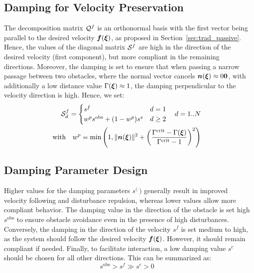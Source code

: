 \subsection{Damping for Velocity Preservation}
The decomposition matrix $\mathcal{Q}^{f}$ is an orthonormal basis with the first vector being parallel to the desired velocity $\boldsymbol{f}(\boldsymbol{\xi})$, as proposed in Section~\ref{sec:trad_passive}. Hence, the values of the diagonal matrix $\mathcal{S}^{f}$ are high in the direction of the desired velocity (first component), but more compliant in the remaining directions. 
Moreover, the damping is set to ensure that when passing a narrow passage between two obstacles, where the normal vector cancels $\boldsymbol{n}(\boldsymbol{\xi}) \approx 0\boldsymbol{0}$, with additionally a low distance value $\Gamma(\boldsymbol{\xi}) \approx 1$, the damping perpendicular to the velocity direction is high. Hence, we set:
\begin{equation}
  \begin{split}
  \mathcal{S}^{f}_{d} =
  \begin{cases}
    s^{f} & d = 1 \\
    w^p s^{\mathrm{obs}} + (1- w^p) s^s & d \geq 2 
  \end{cases} \quad d = 1 .. N\\
  \text{with} \quad
   w^p = \min \left(1,  \| \boldsymbol{n}(\boldsymbol{\xi}) \|^2 + \left(\frac{\Gamma^{\mathrm{crit}} -\Gamma(\boldsymbol{\xi})}{\Gamma^{\mathrm{crit}} - 1}\right) ^2 \right)
  \end{split}
\end{equation}

\subsection{Damping Parameter Design}
Higher values for the damping parameters $s^{(\cdot})$ generally result in improved velocity following and disturbance repulsion, whereas lower values allow more compliant behavior.
The damping value in the direction of the obstacle is set high $s^{\mathrm{obs}}$ to ensure obstacle avoidance even in the presence of high disturbances. 
Conversely, the damping in the direction of the velocity $s^{f}$ is set medium to high, as the system should follow the desired velocity $\boldsymbol{f}(\boldsymbol{\xi})$. However, it should remain compliant if needed.
Finally, to facilitate interaction, a low damping value $s^{c}$ should be chosen for all other directions.
This can be summarized as:
\begin{equation}
s^{\mathrm{obs}} > s^{f} \gg s^{c} > 0
\end{equation}
